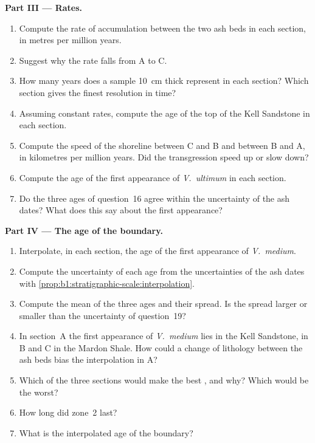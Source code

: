 \begin{problem}
\noindent\textbf{Part III --- Rates.}
\begin{enumerate}[resume]
  \item Compute the rate of accumulation between the two ash beds in each
        section, in metres per million years.
  \item Suggest why the rate falls from A to C.
  \item How many years does a sample \qty{10}{cm} thick represent in each
        section? Which section gives the finest resolution in time?
  \item Assuming constant rates, compute the age of the top of the Kell
        Sandstone in each section.
  \item Compute the speed of the shoreline between C and B and between B and A,
        in kilometres per million years. Did the transgression speed up or slow
        down?
  \item Compute the age of the first appearance of \emph{V.~ultimum} in each
        section.
  \item Do the three ages of question~16 agree within the uncertainty of the
        ash dates? What does this say about the first appearance?
\end{enumerate}

\noindent\textbf{Part IV --- The age of the boundary.}
\begin{enumerate}[resume]
  \item Interpolate, in each section, the age of the first appearance of
        \emph{V.~medium}.
  \item Compute the uncertainty of each age from the uncertainties of the ash
        dates with \cref{prop:b1:stratigraphic-scale:interpolation}.
  \item Compute the mean of the three ages and their spread. Is the spread
        larger or smaller than the uncertainty of question~19?
  \item In section~A the first appearance of \emph{V.~medium} lies in the Kell
        Sandstone, in B and C in the Mardon Shale. How could a change of
        lithology between the ash beds bias the interpolation in A?
  \item Which of the three sections would make the best , and
        why? Which would be the worst?
  \item How long did zone~2 last?
  \item What is the interpolated age of the boundary?
\end{enumerate}
\end{problem}
